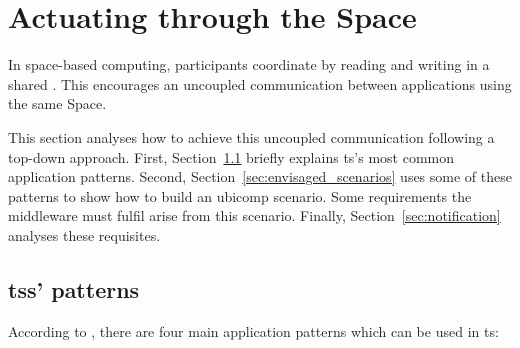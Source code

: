 \section{Actuating through the Space}
\label{sec:actuation_space}



In space-based computing, participants coordinate by reading and writing in a shared \Space{}.
This encourages an uncoupled communication between applications using the same Space.


This section analyses how to achieve this uncoupled communication following a top-down approach.
First, Section~\ref{sec:ts_patterns} briefly explains \acl{ts}'s most common application patterns. %
Second, Section~\ref{sec:envisaged_scenarios} uses some of these patterns to show how to build an \ac{ubicomp} scenario.
Some requirements the middleware must fulfil arise from this scenario.
Finally, Section~\ref{sec:notification} analyses these requisites.



\subsection{\aclp{ts}' patterns}
\label{sec:ts_patterns}

According to \citet{freeman_javaspaces_1999}, there are four main application patterns which can be used in \ac{ts}:


